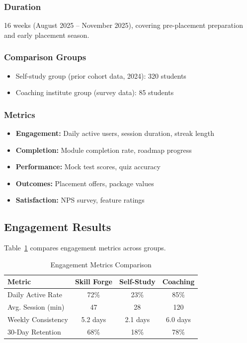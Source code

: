 \documentclass[journal]{IEEEtran}
\begin{document}
\subsubsection{Duration}
16 weeks (August 2025 -- November 2025), covering pre-placement preparation and early placement season.

\subsubsection{Comparison Groups}
\begin{itemize}
    \item Self-study group (prior cohort data, 2024): 320 students
    \item Coaching institute group (survey data): 85 students
\end{itemize}

\subsubsection{Metrics}
\begin{itemize}
    \item \textbf{Engagement:} Daily active users, session duration, streak length
    \item \textbf{Completion:} Module completion rate, roadmap progress
    \item \textbf{Performance:} Mock test scores, quiz accuracy
    \item \textbf{Outcomes:} Placement offers, package values
    \item \textbf{Satisfaction:} NPS survey, feature ratings
\end{itemize}

\subsection{Engagement Results}

Table~\ref{tab:engagement} compares engagement metrics across groups.

\begin{table}[htbp]
\caption{Engagement Metrics Comparison}
\label{tab:engagement}
\centering
\begin{tabular}{lccc}
\toprule
\textbf{Metric} & \textbf{Skill Forge} & \textbf{Self-Study} & \textbf{Coaching} \\
\midrule
Daily Active Rate & 72\% & 23\% & 85\% \\
Avg. Session (min) & 47 & 28 & 120 \\
Weekly Consistency & 5.2 days & 2.1 days & 6.0 days \\
30-Day Retention & 68\% & 18\% & 78\% \\
\bottomrule
\end{tabular}
\end{table}
\end{document}
